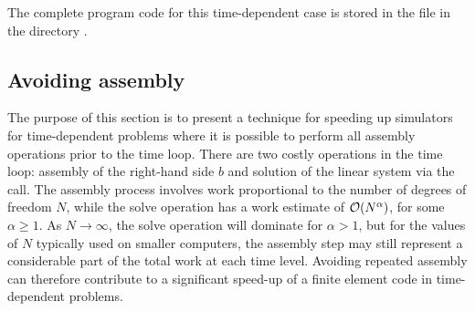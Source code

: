 The complete program code for this time-dependent case is stored in the
file  in the directory .

\subsection{Avoiding assembly}
\label{langtangen:timedep:diffusion1:noassemble}

The purpose of this section is to present a technique for speeding up
\fenics{} simulators for time-dependent problems where it is possible
to perform all assembly operations prior to the time loop.  There are
two costly operations in the time loop: assembly of the right-hand side
$b$ and solution of the linear system via the  call. The
assembly process involves work proportional to the number of degrees of
freedom $N$, while the solve operation has a work estimate of ${\cal O}(
N^{\alpha})$, for some $\alpha\geqslant 1$. As $N\rightarrow\infty$, the
solve operation will dominate for $\alpha>1$, but for the values of $N$
typically used on smaller computers, the assembly step may still represent
a considerable part of the total work at each time level. Avoiding
repeated assembly can therefore contribute to a significant speed-up of
a finite element code in time-dependent problems.

